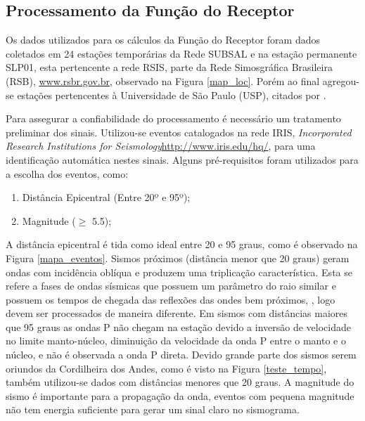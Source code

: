 \subsection{Processamento da Função do Receptor}

Os dados utilizados para os cálculos da Função do Receptor foram dados coletados em 24 estações temporárias da Rede SUBSAL e na estação permanente SLP01, esta pertencente a rede RSIS, parte da Rede Simosgráfica Brasileira (RSB), \url{www.rsbr.gov.br}, observado na Figura \ref{map_loc}. Porém ao final agregou-se estações pertencentes à Universidade de São Paulo (USP), citados por \cite{Assumpcao_Brazil_2013}. 

Para assegurar a confiabilidade do processamento é necessário um tratamento preliminar dos sinais. Utilizou-se eventos catalogados na rede IRIS, \textit{Incorporated Research Institutions for Seismology}\url{http://www.iris.edu/hq/}, para uma identificação automática nestes sinais. Alguns pré-requisitos foram utilizados para a escolha dos eventos, como:

\begin{enumerate}
\item Distância Epicentral (Entre 20º e 95º);
\item Magnitude ($\geq$ 5.5);
\end{enumerate}

A distância epicentral é tida como ideal entre 20 e 95 graus, como é observado na Figura \ref{mapa_eventos}. Sismos próximos (distância menor que 20 graus) geram ondas com incidência oblíqua e produzem uma triplicação característica. Esta se refere a fases de ondas sísmicas que possuem um parâmetro do raio similar e possuem os tempos de chegada das reflexões das ondes bem próximos, \cite{stahler_triplicated_2012}, logo devem ser processados de maneira diferente. Em sismos com distâncias maiores que 95 graus as ondas P não chegam na estação devido a inversão de velocidade no limite manto-núcleo, diminuição da velocidade da onda P entre o manto e o núcleo, e não é observada a onda P direta. Devido grande parte dos sismos serem oriundos da Cordilheira dos Andes, como é visto na Figura \ref{teste_tempo}, também utilizou-se dados com distâncias menores que 20 graus. A magnitude do sismo é importante para a propagação da onda, eventos com pequena magnitude não tem energia suficiente para gerar um sinal claro no sismograma.

